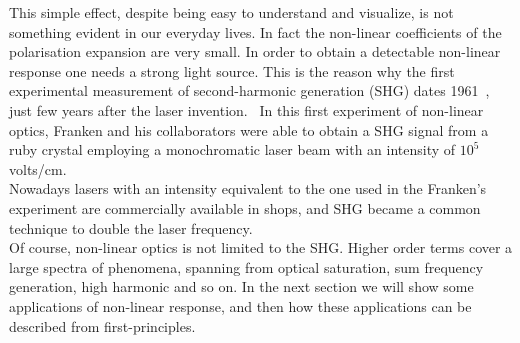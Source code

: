 This simple effect, despite being easy to understand and visualize, is not something evident in our everyday lives. In fact the non-linear coefficients of the polarisation expansion are very small. In order to obtain a detectable non-linear response one needs a strong light source. This is the reason why the first experimental measurement of second-harmonic generation (SHG) dates 1961~\cite{franken1961generation}, just few years after the laser invention.~\cite{maiman1960stimulated} In this first experiment of non-linear optics, Franken and his collaborators were able to obtain a SHG signal from a ruby crystal employing a monochromatic laser beam with an intensity of $10^5$ volts/cm.\\ %
Nowadays lasers with an intensity equivalent to the one used in the Franken's experiment are commercially available in shops, and SHG became a common technique to double the laser frequency.\\
Of course, non-linear optics is not limited to the SHG. Higher order terms cover a large spectra of phenomena, spanning from optical saturation, sum frequency generation, high harmonic and so on. In the next section we will show some applications of non-linear response, and then how these applications can be described from first-principles.

